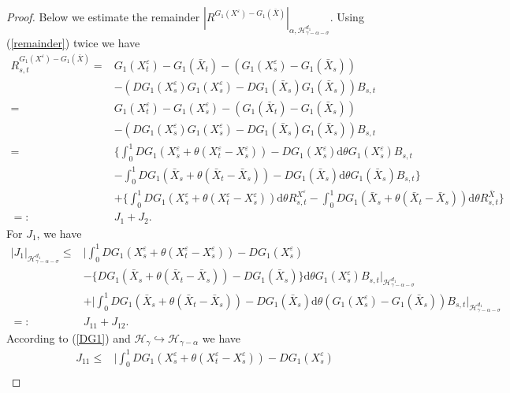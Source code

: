 \documentclass[10pt,a4paper]{amsart}
\begin{document}
\begin{proof}
	
	Below we estimate the remainder $|R^{G_1(X^\varepsilon)-G_1(\bar{X})} |_{\alpha, \mathcal H_{\gamma-\alpha-\sigma}^{d_1} }$.
	Using (\ref{remainder}) twice we have
	\begin{align*}
		R_{s,t}^{G_1(X^\varepsilon)-G_1(\bar{X})}
		=&G_1(X_t^\varepsilon)-G_1(\bar{X}_t)-(G_1(X_s^\varepsilon)-G_1(\bar{X}_s))  \nonumber\\ &-(DG_1(X_s^\varepsilon)G_1(X_s^\varepsilon)-DG_1(\bar{X}_s)G_1(\bar{X}_s)) B_{s,t} \nonumber\\
		=& G_1(X_t^\varepsilon)-G_1(X_s^\varepsilon)-(G_1(\bar{X}_t)-G_1(\bar{X}_s)) \nonumber\\
		&-(DG_1(X_s^\varepsilon)G_1(X_s^\varepsilon)-DG_1(\bar{X}_s)G_1(\bar{X}_s)) B_{s,t} \nonumber\\
		=& \bigg\{\int_0^1 DG_1(X_s^\varepsilon+\theta (X_t^\varepsilon-X_s^\varepsilon))-DG_1(X_s^\varepsilon) \mathrm{d} \theta G_1(X_s^\varepsilon)  B_{s,t} \nonumber\\
		&-\int_0^1 DG_1(\bar{X}_s+\theta (\bar{X}_t-\bar{X}_s))-DG_1(\bar{X}_s) \mathrm{d} \theta G_1(\bar{X}_s)  B_{s,t} \bigg\}\nonumber\\
		&+\bigg\{ \int_0^1 DG_1(X_s^\varepsilon+\theta (X_t^\varepsilon-X_s^\varepsilon)) \mathrm{d} \theta R_{s,t}^{X^\varepsilon}
		-\int_0^1 DG_1(\bar{X}_s+\theta (\bar{X}_t-\bar{X}_s)) \mathrm{d} \theta R_{s,t}^{\bar{X}} \bigg\} \nonumber\\
		=: & J_1 + J_2.
	\end{align*}	
	For $J_1$, we have
	\begin{align*}%
		|J_1 |_{\mathcal H_{\gamma-\alpha-\sigma}^{d_1} }
		\leq & \bigg| \int_0^1 DG_1(X_s^\varepsilon+\theta (X_t^\varepsilon-X_s^\varepsilon))-DG_1(X_s^\varepsilon)   \nonumber\\
		&-\{ DG_1(\bar{X}_s+\theta (\bar{X}_t-\bar{X}_s))-DG_1(\bar{X}_s)\} \mathrm{d} \theta G_1(X_s^\varepsilon)  B_{s,t} \bigg|_{\mathcal H_{\gamma-\alpha-\sigma}^{d_1} }  \nonumber\\
		&+ \bigg|\int_0^1 DG_1(\bar{X}_s+\theta (\bar{X}_t-\bar{X}_s))-DG_1(\bar{X}_s) \mathrm{d} \theta (G_1(X_s^\varepsilon)-G_1(\bar{X}_s)) B_{s,t}  \bigg|_{\mathcal H_{\gamma-\alpha-\sigma}^{d_1} }  \nonumber\\
		=: & J_{11}+J_{12}.
	\end{align*}	
	According to (\ref{DG1}) and $\mathcal H_\gamma \hookrightarrow \mathcal H_{\gamma-\alpha}$ we have
	\begin{align}\label{J11}
		J_{11} \leq &\bigg| \int_0^1 DG_1(X_s^\varepsilon+\theta (X_t^\varepsilon-X_s^\varepsilon))-DG_1(X_s^\varepsilon)   \nonumber\\

\end{align}
\end{proof}
\end{document}
